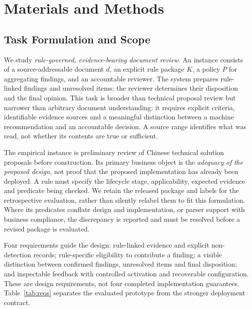 \section{Materials and Methods}

\subsection{Task Formulation and Scope}\label{sec:problem}

We study \emph{rule-governed, evidence-bearing document review}. An instance consists of a source-addressable document $d$, an explicit rule package $K$, a policy $P$ for aggregating findings, and an accountable reviewer. The system prepares rule-linked findings and unresolved items; the reviewer determines their disposition and the final opinion. This task is broader than technical proposal review but narrower than arbitrary document understanding: it requires explicit criteria, identifiable evidence sources and a meaningful distinction between a machine recommendation and an accountable decision. A source range identifies what was read, not whether its contents are true or sufficient.

The empirical instance is preliminary review of Chinese technical solution proposals before construction. Its primary business object is the \emph{adequacy of the proposed design}, not proof that the proposed implementation has already been deployed. A rule must specify the lifecycle stage, applicability, expected evidence and predicate being checked. We retain the released package and labels for the retrospective evaluation, rather than silently relabel them to fit this formulation. Where its predicates conflate design and implementation, or parser support with business compliance, the discrepancy is reported and must be resolved before a revised package is evaluated.

Four requirements guide the design: rule-linked evidence and explicit non-detection records; rule-specific eligibility to contribute a finding; a visible distinction between confirmed findings, unresolved items and final disposition; and inspectable feedback with controlled activation and recoverable configuration. These are design requirements, not four completed implementation guarantees. Table~\ref{tab:reqs} separates the evaluated prototype from the stronger deployment contract.

